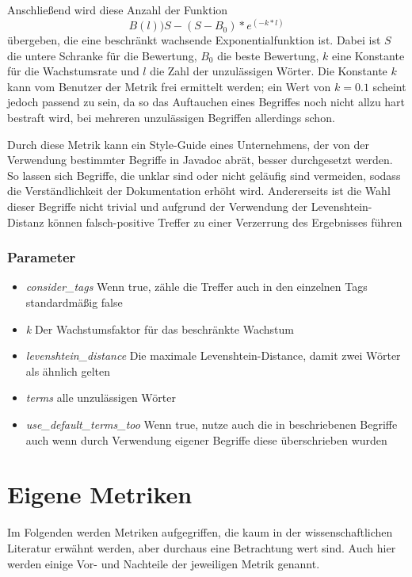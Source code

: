 Anschließend wird diese Anzahl der Funktion
\begin{equation}
     B(l))S-(S-B_0)*e^(-k*l)
 \end{equation} übergeben, die eine beschränkt wachsende Exponentialfunktion ist. Dabei ist $S$ die untere Schranke für die Bewertung, $B_0$ die beste Bewertung,  $k$ eine Konstante für die Wachstumsrate und $l$ die Zahl der unzulässigen Wörter. 
  Die Konstante $k$ kann vom Benutzer der Metrik frei ermittelt werden; ein Wert von $k=0.1$ scheint jedoch passend zu sein, da so das Auftauchen eines Begriffes noch nicht allzu hart bestraft wird, bei mehreren unzulässigen Begriffen allerdings schon.
  
  Durch diese Metrik kann ein Style-Guide eines Unternehmens, der von der Verwendung bestimmter Begriffe in Javadoc abrät, besser durchgesetzt werden. So lassen sich Begriffe, die unklar sind oder nicht geläufig sind vermeiden, sodass die Verständlichkeit der Dokumentation erhöht wird. Andererseits ist die Wahl dieser Begriffe nicht trivial und aufgrund der Verwendung der Levenshtein-Distanz können falsch-positive Treffer zu einer Verzerrung des Ergebnisses führen
  \subsubsection{Parameter}
\begin{itemize}
    \item \textit{consider\_tags} Wenn true, zähle die Treffer auch in den einzelnen Tags standardmäßig false
    \item \textit{k} Der Wachstumsfaktor für das beschränkte Wachstum
    \item \textit{levenshtein\_distance} Die maximale Levenshtein-Distance, damit zwei Wörter als ähnlich gelten
    \item \textit{terms} alle unzulässigen Wörter
    \item \textit{use\_default\_terms\_too} Wenn true, nutze auch die in \cite{HowtoWriteDocCommentsfortheJavadocTool} beschriebenen Begriffe auch wenn durch Verwendung eigener Begriffe diese überschrieben wurden
\end{itemize}

 \section{Eigene Metriken}
 Im Folgenden werden Metriken aufgegriffen, die kaum in der wissenschaftlichen Literatur erwähnt werden, aber durchaus eine Betrachtung wert sind. Auch hier werden einige Vor- und Nachteile der jeweiligen Metrik genannt.
